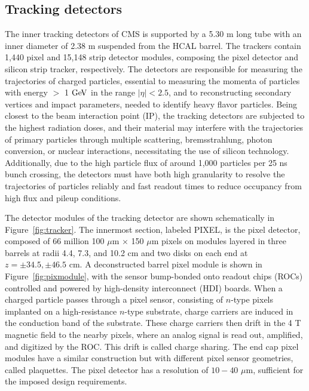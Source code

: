 \subsection{Tracking detectors}

The inner tracking detectors of CMS is supported by a 5.30 m long tube with an inner diameter of 2.38 m suspended from the HCAL barrel. The trackers contain 1,440 pixel and 15,148 strip detector modules, composing the pixel detector and silicon strip tracker, respectively. The detectors are responsible for measuring the trajectories of charged particles, essential to measuring the momenta of particles with energy $>$ 1 $\mathrm{Ge\kern -0.1em V}$ in the range $|\eta|<2.5$, and to reconstructing secondary vertices and impact parameters, needed to identify heavy flavor particles. Being closest to the beam interaction point (IP), the tracking detectors are subjected to the highest radiation doses, and their material may interfere with the trajectories of primary particles through multiple scattering, bremsstrahlung, photon conversion, or nuclear interactions, necessitating the use of silicon technology. Additionally, due to the high particle flux of around 1,000 particles per 25 ns bunch crossing, the detectors must have both high granularity to resolve the trajectories of particles reliably and fast readout times to reduce occupancy from high flux and pileup conditions. 

\indent The detector modules of the tracking detector are shown schematically in Figure~\ref{fig:tracker}. The innermost section, labeled PIXEL, is the pixel detector, composed of 66 million 100 $\mu$m $\times$ 150 $\mu$m pixels on modules layered in three barrels at radii 4.4, 7.3, and 10.2 cm and two disks on each end at $z = \pm34.5, \pm46.5$ cm. A deconstructed barrel pixel module is shown in Figure~\ref{fig:pixmodule}, with the sensor bump-bonded onto readout chips (ROCs) controlled and powered by high-density interconnect (HDI) boards. When a charged particle passes through a pixel sensor, consisting of $n$-type pixels implanted on a high-resistance $n$-type substrate, charge carriers are induced in the conduction band of the substrate. These charge carriers then drift in the 4 T magnetic field to the nearby pixels, where an analog signal is read out, amplified, and digitized by the ROC. This drift is called charge sharing. The end cap pixel modules have a similar construction but with different pixel sensor geometries, called plaquettes. The pixel detector has a resolution of $10-40$ $\mu$m, sufficient for the imposed design requirements. 

